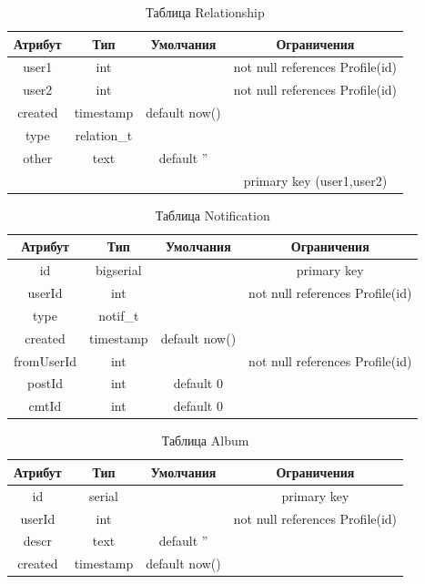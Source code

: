 \begin{table}[H]
  \centering
  \begin{tabular}{|c|c|c|c|}
      \hline
      \bfseries Атрибут & \bfseries Тип & \bfseries Умолчания & Ограничения \\
      \hline
user1	&	int		&&not null	references Profile(id)\\
user2	&	int		&&not null	references Profile(id)\\
created	&	timestamp			&default now() &\\
type	&	relation\_t &&\\
other	&	text	&default 	'' &\\
&&&primary key	(user1,user2) \\
      \hline
  \end{tabular}
  \caption{Таблица Relationship}
\end{table}


\begin{table}[H]
  \centering
  \begin{tabular}{|c|c|c|c|}
      \hline
      \bfseries Атрибут & \bfseries Тип & \bfseries Умолчания & Ограничения \\
      \hline
id		&	bigserial &&			primary key \\
userId	&	int		&&not null	references Profile(id)\\
type 	&	notif\_t &&\\
created	&	timestamp			&default now() &\\
fromUserId&	int		&&not null	references Profile(id)\\
postId 	&	int		&default 	0 &\\
cmtId 	&	int		&default 	0 &\\
      \hline
  \end{tabular}
  \caption{Таблица Notification}
\end{table}


\begin{table}[H]
  \centering
  \begin{tabular}{|c|c|c|c|}
      \hline
      \bfseries Атрибут & \bfseries Тип & \bfseries Умолчания & Ограничения \\
      \hline
id		&	serial &&	primary key \\
userId 	&	int		&&not null	references Profile(id)\\
descr 	&	text	&default 	'' &\\
created &	timestamp			&default now() &\\
      \hline
  \end{tabular}
  \caption{Таблица Album}
\end{table}



